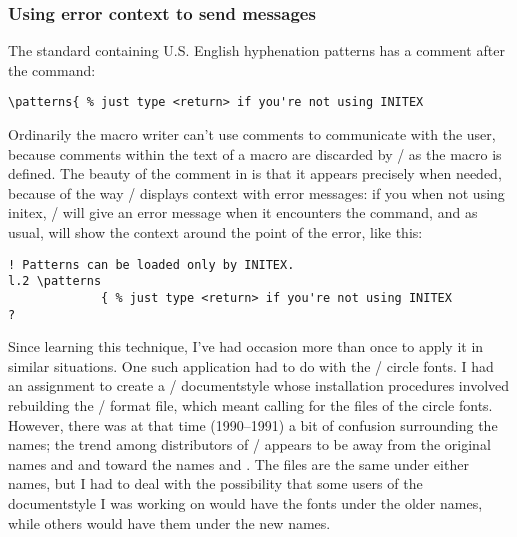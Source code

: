 {\subsubsection{Using error context to send messages}
\label{ss:errcontextcomments}
The standard  containing U.S. English hyphenation
patterns has a comment after the  command:%
 \begin{verbatim}
\patterns{ % just type <return> if you're not using INITEX
\end{verbatim}
  Ordinarily the macro writer can't use comments to communicate
with the user, because comments within the text of a macro
are discarded by \tex/
as the macro is defined.  The beauty of the comment in 
is that it appears precisely when needed, because of the
way \tex/ displays context with error messages: if you 
 when not using {\sc initex}, \tex/ will give an
error message when it encounters the  command,
and as usual, will show the context around the point of the
error, like this:
\par{}
 \begin{verbatim}
! Patterns can be loaded only by INITEX.
l.2 \patterns
             { % just type <return> if you're not using INITEX
?
\end{verbatim}
Since learning this technique, I've had occasion more than once to
apply it in similar situations. One such application had to do with
the \latex/ circle fonts. I had an assignment to create a
\latex/ documentstyle whose installation procedures involved
rebuilding the \latex/ format file, which meant calling
for the  files of the circle fonts.
However, there was at that time (1990--1991) a bit of
confusion surrounding the names; the trend among distributors of \tex/
appears to be away from the original names 
and  and toward the names
 and .
The  files are the same under either names, but
I had to deal with the possibility that some users of the
documentstyle I was working on would have the fonts under the older
names, while others would have them under the new names.

}
